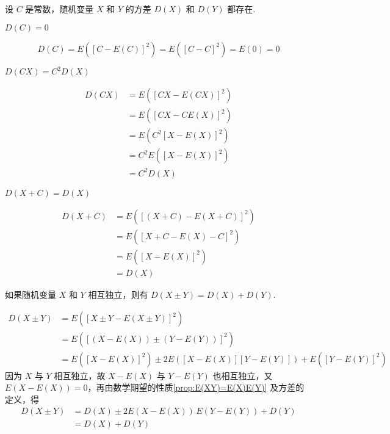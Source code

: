 设 $C$ 是常数，随机变量 $X$ 和 $Y$ 的方差 $D(X)$ 和 $D(Y)$ 都存在.

\setcounter{propertyname}{0}

\begin{property}
    $D(C) = 0$
\end{property}

\begin{myproof}
    $$
    D(C) = E([C-E(C)]^2) = E([C-C]^2) = E(0) = 0
    $$
\end{myproof}

\begin{property}
    $D(CX) = C^2 D(X)$
\end{property}

\begin{myproof}
    $$
    \begin{aligned}
        D(CX) &= E([CX - E(CX)]^2) \\
        &= E([CX - CE(X)]^2) \\
        &= E(C^2 [X-E(X)]^2) \\
        &= C^2 E([X-E(X)]^2) \\
        &= C^2 D(X)
    \end{aligned}
    $$
\end{myproof}

\begin{property}
    $D(X+C) = D(X)$
\end{property}

\begin{myproof}
    $$
    \begin{aligned}
        D(X+C) &= E([(X+C) - E(X+C)]^2) \\
        &= E([X + C - E(X) - C]^2) \\
        &= E([X-E(X)]^2) \\
        &= D(X)
    \end{aligned}
    $$
\end{myproof}

\begin{property} \label{prop:D(X+Y)=D(X)+D(Y)}
    如果随机变量 $X$ 和 $Y$ 相互独立，则有 $D(X \pm Y) = D(X)+D(Y)$.
\end{property}

\begin{myproof}
    $$
    \begin{aligned}
        D(X \pm Y) &= E([X \pm Y - E(X \pm Y)]^2) \\
        &= E([(X-E(X)) \pm (Y-E(Y))]^2) \\
        &= E([X-E(X)]^2) \pm 2E([X-E(X)][Y-E(Y)]) + E([Y-E(Y)]^2)
    \end{aligned}
    $$
    因为 $X$ 与 $Y$ 相互独立，故 $X-E(X)$ 与 $Y-E(Y)$ 也相互独立，又 $E(X-E(X)) = 0$，再由数学期望的性质\ref*{prop:E(XY)=E(X)E(Y)} 及方差的定义，得
    $$
    \begin{aligned}
        D(X \pm Y) &= D(X) \pm 2E(X-E(X)) \, E(Y-E(Y)) + D(Y) \\
        &= D(X) + D(Y)
    \end{aligned}
    $$
\end{myproof}

